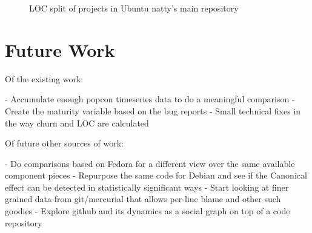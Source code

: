 \documentclass[11pt]{article}
\begin{document}
\begin{figure}[htb]
  \begin{center}
  \end{center}
  \caption{LOC split of projects in Ubuntu natty's main repository}
  \label{fig:gnuinlinux}
\end{figure}

\section{Future Work}

Of the existing work:

- Accumulate enough popcon timeseries data to do a meaningful comparison
- Create the maturity variable based on the bug reports
- Small technical fixes in the way churn and LOC are calculated

Of future other sources of work:

- Do comparisons based on Fedora for a different view over the same available component pieces
- Repurpose the same code for Debian and see if the Canonical effect can be detected in statistically significant ways
- Start looking at finer grained data from git/mercurial that allows per-line blame and other such goodies
- Explore github and its dynamics as a social graph on top of a code repository
\end{document}
